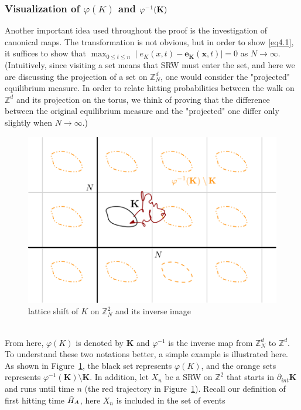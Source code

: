 \documentclass[
11pt, %
a4paper, %
oneside, %
headinclude,footinclude, %
BCOR5mm, %
]{scrartcl}
\begin{document}
\subsubsection{Visualization of $\varphi(K)$ and $\varphi^{-1}(\textnormal{\textbf{K}})$}
Another important idea used throughout the proof is the investigation of canonical maps. The transformation is not obvious, but in order to show \eqref{eq4.1}, it suffices to show that $\max_{0 \leq t \leq n}\mid e_K(x,t) - \mathbf{e}_{\mathbf{K}}(\mathbf{x},t) \mid =0$ as $N \rightarrow \infty$. (Intuitively, since visiting a set means that SRW must enter the set, and here we are discussing the projection of a set on $\mathbb{Z}_N^d$, one would consider the "projected" equilibrium measure. In order to relate hitting probabilities between the walk on $\mathbb{Z}^d$ and its projection on the torus, we think of proving that the difference between the original equilibrium measure and the "projected" one differ only slightly when $N \rightarrow \infty$.)  
\begin{figure}[htb]
    \centering
    \includegraphics[width=0.72\columnwidth]{Figures/lattice shift.png}
    \caption{lattice shift of $K$ on $\mathbb{Z}_N^2$ and its inverse image}
    \label{lattice}
\end{figure}
\\From here, $\varphi(K)$ is denoted by $\mathbf{K}$ and $\varphi^{-1}$ is the inverse map from $\mathbb{Z}_N^d$ to $\mathbb{Z}^d$. To understand these two notations better, a simple example is illustrated here. 
As shown in Figure~\ref{lattice}, the black set represents $\varphi(K)$, and the orange sets represents $\varphi^{-1}(\mathbf{K})\setminus \mathbf{K}$. In addition, let $X_n$ be a SRW on $\mathbb{Z}^2$ that starts in $\partial_{int}\mathbf{K}$ and runs until time $n$ (the red trajectory in Figure~\ref{lattice}). Recall our definition of first hitting time $\Tilde{H}_A$, here $X_n$ is included in the set of events 
\end{document}
